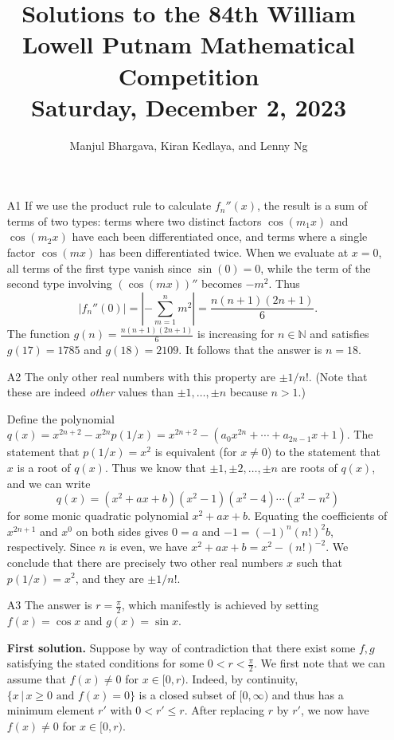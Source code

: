 \documentclass[amssymb,twocolumn,pra,10pt,aps]{revtex4-1}
\begin{document}
\title{Solutions to the 84th William Lowell Putnam Mathematical Competition \\
    Saturday, December 2, 2023}
\author{Manjul Bhargava, Kiran Kedlaya, and Lenny Ng}
\noaffiliation
\maketitle

\begin{itemize}
\item[A1]
If we use the product rule to calculate $f_n''(x)$, the result is a sum of terms of two types: terms where two distinct factors $\cos(m_1x)$ and $\cos(m_2x)$ have each been differentiated once, and terms where a single factor $\cos(mx)$ has been differentiated twice. When we evaluate at $x=0$, all terms of the first type vanish since $\sin(0)=0$, while the term of the second type involving $(\cos(mx))''$ becomes $-m^2$. Thus 
\[
|f_n''(0)| = \left|-\sum_{m=1}^n m^2\right| = \frac{n(n+1)(2n+1)}{6}.
\]
The function $g(n) = \frac{n(n+1)(2n+1)}{6}$ is increasing for $n\in\mathbb{N}$ and satisfies $g(17)=1785$ and $g(18)=2109$. It follows that the answer is $n=18$.

\item[A2]
The only other real numbers with this property are $\pm 1/n!$.
(Note that these are indeed \emph{other} values than $\pm 1, \dots, \pm n$ because $n>1$.)

Define the polynomial $q(x) = x^{2n+2}-x^{2n}p(1/x) = x^{2n+2}-(a_0x^{2n}+\cdots+a_{2n-1}x+1)$. The statement that $p(1/x)=x^2$ is equivalent (for $x\neq 0$) to the statement that $x$ is a root of $q(x)$. Thus we know that $\pm 1,\pm 2,\ldots,\pm n$ are roots of $q(x)$, and we can write
\[
q(x) = (x^2+ax+b)(x^2-1)(x^2-4)\cdots (x^2-n^2)
\]
for some monic quadratic polynomial $x^2+ax+b$. Equating the coefficients of $x^{2n+1}$ and $x^0$ on both sides gives $0=a$ and $-1=(-1)^n(n!)^2 b$, respectively. Since $n$ is even, we have $x^2+ax+b = x^2-(n!)^{-2}$. We conclude that there are precisely two other real numbers $x$ such that $p(1/x)=x^2$, and they are $\pm 1/n!$.

\item[A3]
The answer is $r=\frac{\pi}{2}$, which manifestly is achieved by setting $f(x)=\cos x$ and $g(x)=\sin x$.

\noindent
\textbf{First solution.}
Suppose by way of contradiction that there exist some $f,g$ satisfying the stated conditions for some $0 < r<\frac{\pi}{2}$. We first note that we can assume that $f(x) \neq 0$ for $x\in [0,r)$. Indeed, by continuity, $\{x\,|\,x\geq 0 \text{ and } f(x)=0\}$ is a closed subset of $[0,\infty)$ and thus has a minimum element $r'$ with $0<r'\leq r$. After replacing $r$ by $r'$, we now have $f(x)\neq 0$ for $x\in [0,r)$.


\end{itemize}
\end{document}

